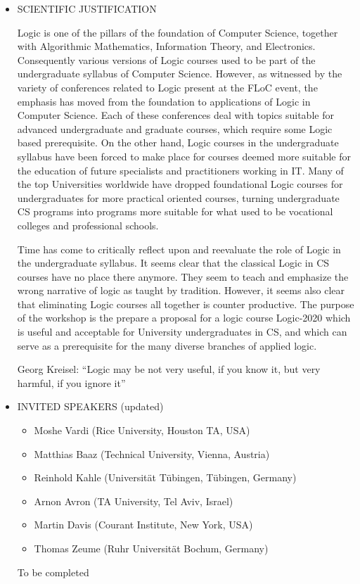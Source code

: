 \documentclass[prodmode,acmtecs]{acmsmall} %
\begin{document}
\begin{itemize}\item  SCIENTIFIC JUSTIFICATION  
 
  Logic is one of the pillars of the foundation of Computer Science, together with Algorithmic Mathematics, Information Theory, and Electronics. Consequently various versions of Logic courses used to be part of the undergraduate syllabus of Computer Science. However, as witnessed by the variety of conferences related to Logic present at the FLoC event, the emphasis has moved from the foundation to applications of Logic in Computer Science. Each of these conferences deal with topics suitable for advanced undergraduate and graduate courses, which require some Logic based prerequisite. On the other hand, Logic courses in the undergraduate syllabus have been forced to make place for courses deemed more suitable for the education of future specialists and practitioners working in IT. Many of the top Universities worldwide have dropped foundational Logic courses for undergraduates for more practical oriented courses, turning undergraduate CS programs into programs more suitable for what used to be vocational colleges and professional schools. 
 
  Time has come to critically reflect upon and reevaluate the role of Logic in the undergraduate syllabus. It seems clear that the classical Logic in CS courses have no place there anymore. They seem to teach and emphasize the wrong narrative of logic as taught by tradition. However, it seems also clear that eliminating Logic courses all together is counter productive. The purpose of the workshop is the prepare a proposal for a logic course Logic-2020 which is useful and acceptable for University undergraduates in CS, and which can serve as a prerequisite for the many diverse branches of applied logic. 
 
  Georg Kreisel: ``Logic may be not very useful, if you know it, but very harmful, if you ignore it''  
 
\item  INVITED SPEAKERS (updated) 
 
\begin{itemize}\item  Moshe Vardi (Rice University, Houston TA, USA) 
\item  Matthias Baaz (Technical University, Vienna, Austria) 
\item  Reinhold Kahle (Universität Tübingen, Tübingen, Germany) 
\item  Arnon Avron (TA University, Tel Aviv, Israel) 
\item  Martin Davis (Courant Institute, New York, USA) 
\item  Thomas Zeume (Ruhr Universität Bochum, Germany)
\end{itemize} 
  To be completed 
 

\end{itemize}
\end{document}

